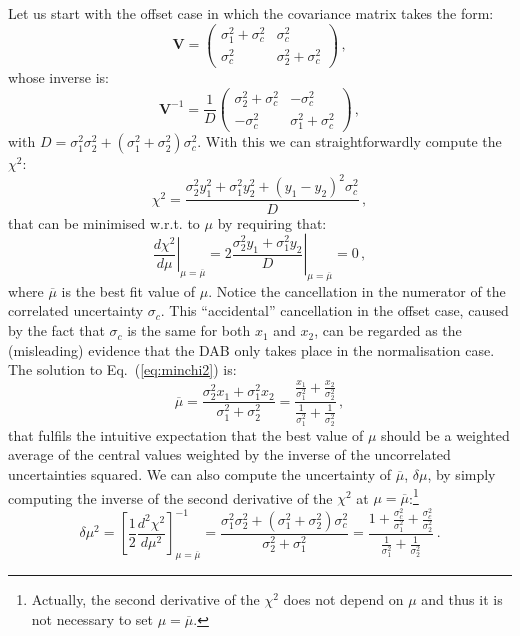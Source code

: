 \documentclass[10pt,a4paper]{article}
\begin{document}
Let us start with the offset case in which the covariance matrix takes
the form:
\begin{equation}
\mathbf{V}=
\begin{pmatrix}
\sigma_1^2+\sigma_c^2& \sigma_c^2\\
\sigma_c^2& \sigma_2^2+\sigma_c^2
\end{pmatrix}\,,
\end{equation}
whose inverse is:
\begin{equation}
\mathbf{V}^{-1}=\frac{1}{D}
\begin{pmatrix}
\sigma_2^2+\sigma_c^2& -\sigma_c^2\\
-\sigma_c^2& \sigma_1^2+\sigma_c^2
\end{pmatrix}\,,
\end{equation}
with $D=\sigma_1^2 \sigma_2^2+(\sigma_1^2+\sigma_2^2)
\sigma_c^2$. With this we can straightforwardly compute the $\chi^2$:
\begin{equation}
\chi^2=\frac{\sigma_2^2y_1^2+\sigma_1^2y_2^2+(y_1-y_2)^2\sigma_c^2}{D}\,,
\end{equation}
that can be minimised w.r.t. to $\mu$ by requiring that:
\begin{equation}\label{eq:minchi2}
  \left.\frac{d\chi^2}{d\mu}\right|_{\mu=\overline{\mu}} = \left.2\frac{\sigma_2^2y_1+\sigma_1^2y_2}{D}\right|_{\mu=\overline{\mu}}=0\,,
\end{equation}
where $\overline{\mu}$ is the best fit value of $\mu$. Notice the
cancellation in the numerator of the correlated uncertainty
$\sigma_c$. This ``accidental'' cancellation in the offset case,
caused by the fact that $\sigma_c$ is the same for both $x_1$ and
$x_2$, can be regarded as the (misleading) evidence that the DAB only
takes place in the normalisation case. The solution to
Eq.~(\ref{eq:minchi2}) is:
\begin{equation}\label{eq:offcv}
\overline{\mu} = \frac{\sigma_2^2x_1+\sigma_1^2x_2}{\sigma_1^2+\sigma_2^2}=\frac{\frac{x_1}{\sigma_1^2}+\frac{x_2}{\sigma_2^2}}{\frac{1}{\sigma_1^2}+\frac{1}{\sigma_2^2}}\,,
\end{equation}
that fulfils the intuitive expectation that the best value of $\mu$
should be a weighted average of the central values weighted by the
inverse of the uncorrelated uncertainties squared. We can also compute
the uncertainty of $\overline{\mu}$, $\delta\mu$, by simply computing
the inverse of the second derivative of the $\chi^2$ at
$\mu=\overline{\mu}$:\footnote{Actually, the second derivative of the
  $\chi^2$ does not depend on $\mu$ and thus it is not necessary to
  set $\mu=\overline{\mu}$.}
\begin{equation}\label{eq:offcvunc}
  \delta\mu^2 = \left[\frac12\frac{d^2\chi^2}{d\mu^2}\right]_{\mu=\overline{\mu}}^{-1} = \frac {\sigma_1^2 \sigma_2^2+(\sigma_1^2+\sigma_2^2) \sigma_c^2}{\sigma_2^2+\sigma_1^2}=\frac {1+\frac{\sigma_c^2}{\sigma_1^2}+\frac{\sigma_c^2}{\sigma_2^2} }{\frac{1}{\sigma_1^2}+\frac{1}{\sigma_2^2}}\,.
\end{equation}
\end{document}
